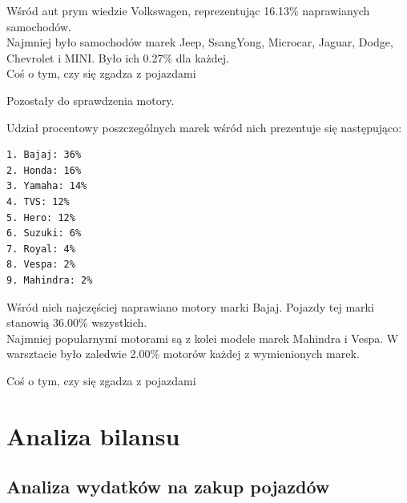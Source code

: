\documentclass{article}\usepackage[]{graphicx}\usepackage[]{xcolor}
\begin{document}
Wśród aut prym wiedzie Volkswagen, reprezentując  16.13\% naprawianych samochodów. \\

Najmniej było samochodów marek Jeep, SsangYong, Microcar, Jaguar, Dodge, Chevrolet i MINI. Było ich 0.27\% dla każdej. \\

{\color{red} Coś o tym, czy się zgadza z pojazdami}

Pozostały do sprawdzenia motory.



Udział procentowy poszczególnych marek wśród nich prezentuje się następująco:

\begin{verbatim}
1. Bajaj: 36%
2. Honda: 16%
3. Yamaha: 14%
4. TVS: 12%
5. Hero: 12%
6. Suzuki: 6%
7. Royal: 4%
8. Vespa: 2%
9. Mahindra: 2%
\end{verbatim}

Wśród nich najczęściej naprawiano motory marki Bajaj. Pojazdy tej marki stanowią 36.00\% wszystkich. \\

Najmniej popularnymi motorami są z kolei modele marek Mahindra i Vespa. W warsztacie było zaledwie 2.00\% motorów każdej z wymienionych marek.

{\color{red} Coś o tym, czy się zgadza z pojazdami}

\section{Analiza bilansu}

\subsection{Analiza wydatków na zakup pojazdów}
\end{document}
